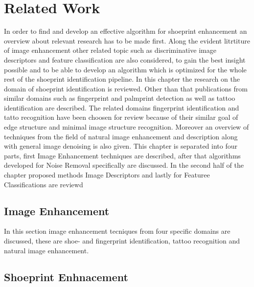 \documentclass[draft,final]{vutinfth} %
\begin{document}
\chapter{Related Work}
\par
In order to find and develop an effective algorithm for shoeprint enhancement an overview about relevant research has to be made first.
Along  the evident litrtiture of image enhancement other related topic such as discriminative image descriptors and feature classification are also considered, to gain the best insight possible and to be able to develop an algorithm which is optimized for the whole rest of the shoeprint identification pipeline.
In this chapter the research on the domain of shoeprint identification is reviewed.
Other than that publications from similar domains such as fingerprint and palmprint detection as well as tattoo identification are described.
The related domains fingerprint identification and tatto recognition have been choosen for review because of their similar goal of edge structure and minimal image structure recognition.
Moreover an overview of techniques from the field of natural image enhancement and description along with general image denoising is also given.
This chapter is separated into four parts, first Image Enhancement techniques are described, after that algorithms developed for Noise Removal specifically are discussed.
In the second half of the chapter proposed methods Image Descriptors and lastly for Featuree Classifications are reviewd

\section{Image Enhancement}
\label{sec:rw:ImageENhancement}

In this section image enhancement tecniques from four specific domains are discussed, these are shoe- and fingerprint identification, tattoo recognition and natural image enhancement.

\section*{Shoeprint Enhnacement}
\end{document}
